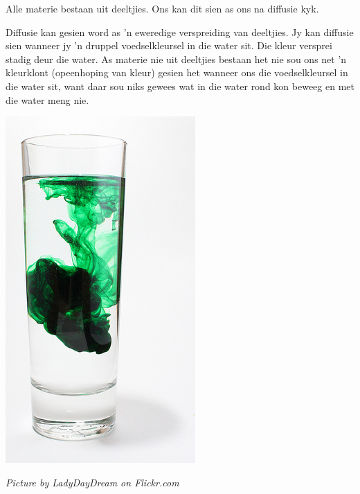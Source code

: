 \label{m38736*id324876121}Alle materie bestaan uit deeltjies. Ons kan dit sien as ons na diffusie kyk. \par
{} 
\begin{minipage}{.5\textwidth}
Diffusie kan gesien word as 'n eweredige verspreiding van deeltjies. Jy kan diffusie sien wanneer jy 'n druppel voedselkleursel in die water sit. Die kleur versprei stadig deur die water. As materie nie uit deeltjies bestaan het nie sou ons net 'n kleurklont (opeenhoping van kleur) gesien het wanneer ons die voedselkleursel in die water sit, want daar sou niks gewees wat in die water rond kon beweeg en met die water meng nie.
\end{minipage}
\begin{minipage}{.5\textwidth}
\begin{center}
 \includegraphics[height=.5\textwidth]{photos/diffusionby-LadyDayDream-flickr.jpg}\par
\textit{Picture by LadyDayDream on Flickr.com}
\end{center}
\end{minipage}

